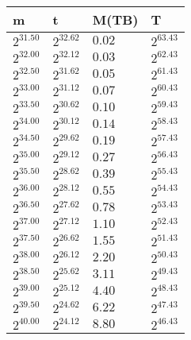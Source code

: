 \begin{tabular}{llll}
m & t & M(TB) & T \\ \hline
$2^{31.50}$ & $2^{32.62}$ & $0.02$ & $2^{63.43}$ \\
$2^{32.00}$ & $2^{32.12}$ & $0.03$ & $2^{62.43}$ \\
$2^{32.50}$ & $2^{31.62}$ & $0.05$ & $2^{61.43}$ \\
$2^{33.00}$ & $2^{31.12}$ & $0.07$ & $2^{60.43}$ \\
$2^{33.50}$ & $2^{30.62}$ & $0.10$ & $2^{59.43}$ \\
$2^{34.00}$ & $2^{30.12}$ & $0.14$ & $2^{58.43}$ \\
$2^{34.50}$ & $2^{29.62}$ & $0.19$ & $2^{57.43}$ \\
$2^{35.00}$ & $2^{29.12}$ & $0.27$ & $2^{56.43}$ \\
$2^{35.50}$ & $2^{28.62}$ & $0.39$ & $2^{55.43}$ \\
$2^{36.00}$ & $2^{28.12}$ & $0.55$ & $2^{54.43}$ \\
$2^{36.50}$ & $2^{27.62}$ & $0.78$ & $2^{53.43}$ \\
$2^{37.00}$ & $2^{27.12}$ & $1.10$ & $2^{52.43}$ \\
$2^{37.50}$ & $2^{26.62}$ & $1.55$ & $2^{51.43}$ \\
$2^{38.00}$ & $2^{26.12}$ & $2.20$ & $2^{50.43}$ \\
$2^{38.50}$ & $2^{25.62}$ & $3.11$ & $2^{49.43}$ \\
$2^{39.00}$ & $2^{25.12}$ & $4.40$ & $2^{48.43}$ \\
$2^{39.50}$ & $2^{24.62}$ & $6.22$ & $2^{47.43}$ \\
$2^{40.00}$ & $2^{24.12}$ & $8.80$ & $2^{46.43}$ \\
\end{tabular}